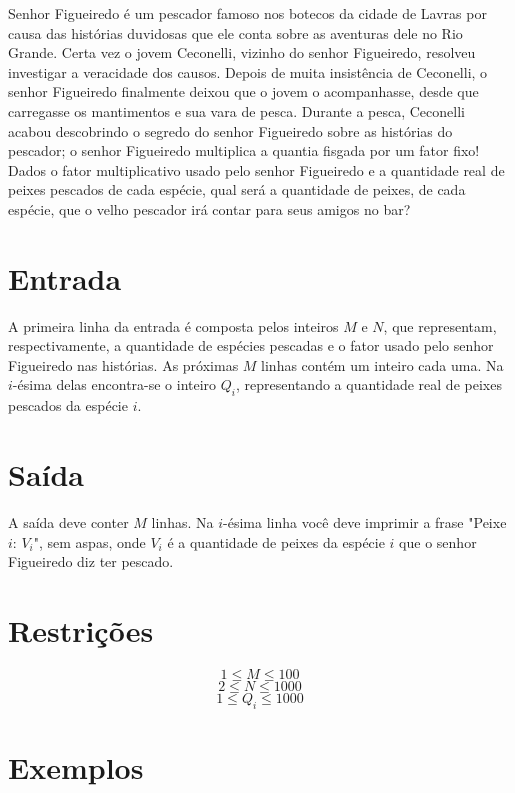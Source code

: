 Senhor Figueiredo é um pescador famoso nos botecos da cidade de Lavras por causa das histórias duvidosas que ele conta sobre as aventuras dele no Rio Grande.
Certa vez o jovem Ceconelli, vizinho do senhor Figueiredo, resolveu investigar a veracidade dos causos.
Depois de muita insistência de Ceconelli, o senhor Figueiredo finalmente deixou que o jovem o acompanhasse, desde que carregasse os mantimentos e sua vara de pesca.
Durante a pesca, Ceconelli acabou descobrindo o segredo do senhor Figueiredo sobre as histórias do pescador; o senhor Figueiredo multiplica a quantia fisgada por um fator fixo!
Dados o fator multiplicativo usado pelo senhor Figueiredo e a quantidade real de peixes pescados de cada espécie, qual será a quantidade de peixes, de cada espécie, que o velho pescador irá contar para seus amigos no bar?

\section*{Entrada}

A primeira linha da entrada é composta pelos inteiros $M$ e $N$, que representam, respectivamente, a quantidade de espécies pescadas e o fator usado pelo senhor Figueiredo nas histórias.
As próximas $M$ linhas contém um inteiro cada uma.
Na $i$-ésima delas encontra-se o inteiro $Q_i$, representando a quantidade real de peixes pescados da espécie $i$.

\section*{Saída}

A saída deve conter $M$ linhas.
Na $i$-ésima linha você deve imprimir a frase "Peixe $i$: $V_i$", sem aspas, onde $V_i$ é a quantidade de peixes da espécie $i$ que o senhor Figueiredo diz ter pescado.

\section*{Restrições}

$$1 \leq M \leq 100$$
$$2 \leq N \leq 1000$$
$$1 \leq Q_i \leq 1000$$


\section*{Exemplos}

\exemplo
